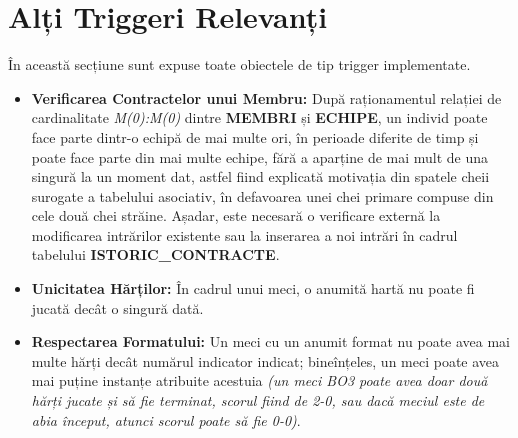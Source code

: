 \documentclass[11pt, a4paper]{article}
\begin{document}
\section{Alți Triggeri Relevanți}
În această secțiune sunt expuse toate obiectele de tip trigger implementate.
\begin{itemize}
    \item \textbf{Verificarea Contractelor unui Membru:} După raționamentul relației de cardinalitate \textit{M(0):M(0)} dintre \textbf{MEMBRI} și \textbf{ECHIPE}, un individ poate face parte dintr-o echipă de mai multe ori, în perioade diferite de timp și poate face parte din mai multe echipe, fără a aparține de mai mult de una singură la un moment dat, astfel fiind explicată motivația din spatele cheii surogate a tabelului asociativ, în defavoarea unei chei primare compuse din cele două chei străine. Așadar, este necesară o verificare externă la modificarea intrărilor existente sau la inserarea a noi intrări în cadrul tabelului \textbf{ISTORIC\_CONTRACTE}.
    \item \textbf{Unicitatea Hărților:} În cadrul unui meci, o anumită hartă nu poate fi jucată decât o singură dată.
    \item \textbf{Respectarea Formatului:} Un meci cu un anumit format nu poate avea mai multe hărți decât numărul indicator indicat; bineînțeles, un meci poate avea mai puține instanțe atribuite acestuia \textit{(un meci BO3 poate avea doar două hărți jucate și să fie terminat, scorul fiind de 2-0, sau dacă meciul este de abia început, atunci scorul poate să fie 0-0)}.
\end{itemize}
\end{document}
